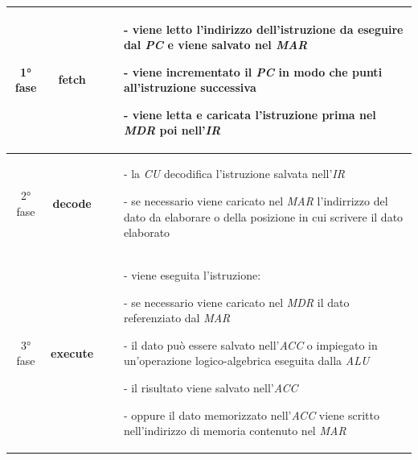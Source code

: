 \documentclass[a4paper]{article}
\begin{document}
\begin{center}
	\begin{tabularx}{\textwidth}{c c X}
		\toprule
		1° fase & \textbf{fetch} &
		\begin{itemize}[topsep=3pt, itemsep=0pt, leftmargin=5pt]
			\item[-] viene letto l'indirizzo dell'istruzione da eseguire dal \textit{PC} e viene salvato nel \textit{MAR}
			\item[-] viene incrementato il \textit{PC} in modo che punti all'istruzione successiva
			\item[-] viene letta e caricata l'istruzione prima nel \textit{MDR} poi nell'\textit{IR}
		\end{itemize} \\
		\midrule
		2° fase & \textbf{decode} &
		\begin{itemize}[topsep=3pt, itemsep=0pt, leftmargin=5pt]
			\item[-] la \textit{CU} decodifica l'istruzione salvata nell'\textit{IR}
			\item[-] se necessario viene caricato nel \textit{MAR} l'indirrizzo del dato da elaborare o della posizione in cui scrivere il dato elaborato 
		\end{itemize} \\
		\midrule
		3° fase & \textbf{execute} &
		\begin{itemize}[topsep=3pt, itemsep=0pt, leftmargin=5pt]
			\item[-] viene eseguita l'istruzione:
			\item[-] se necessario viene caricato nel \textit{MDR} il dato referenziato dal \textit{MAR}
			\item[-] il dato può essere salvato nell'\textit{ACC} o impiegato in un'operazione logico-algebrica eseguita dalla \textit{ALU} 
			\item[-] il risultato viene salvato nell'\textit{ACC}
			\item[-] oppure il dato memorizzato nell'\textit{ACC} viene scritto nell'indirizzo di memoria contenuto nel \textit{MAR}
		\end{itemize} \\
		\bottomrule
	\end{tabularx}
\end{center}
\end{document}
